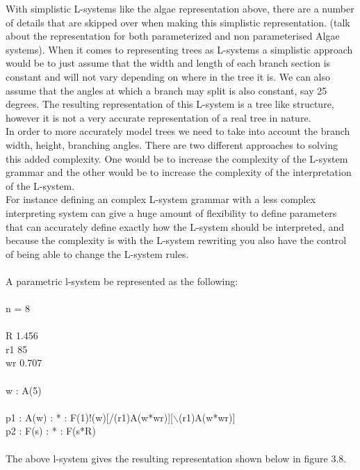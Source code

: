 With simplistic L-systems like the algae representation above, there are a number of details that are skipped over when making this simplistic representation. (talk about the representation for both parameterized and non parameterised Algae systems). When it comes to representing trees as L-systems a simplistic approach would be to just assume that the width and length of each branch section is constant and will not vary depending on where in the tree it is. We can also assume that the angles at which a branch may split is also constant, say 25 degrees. 
The resulting representation of this L-system is a tree like structure, however it is not a very accurate representation of a real tree in nature. \\
In order to more accurately model trees we need to take into account the branch width, height, branching angles. There are two different approaches to solving this added complexity. One would be to increase the complexity of the L-system grammar and the other would be to increase the complexity of the interpretation of the L-system. \\
For instance defining an complex L-system grammar with a less complex interpreting system can give a huge amount of flexibility to define parameters that can accurately define exactly how the L-system should be interpreted, and because the complexity is with the L-system rewriting you also have the control of being able to change the L-system rules. \\
\\ 
A parametric l-system be represented as the following: \\
\\
\hspace*{3cm} n = 8\\
\\
\hspace*{3cm} R 1.456\\
\hspace*{3cm} r1 85\\
\hspace*{3cm} wr 0.707\\
\\
\hspace*{3cm} w : A(5)\\
\\
\hspace*{3cm} p1 : A(w) : * : F(1)!(w)[/(r1)A(w*wr)][$\backslash$(r1)A(w*wr)]\\
\hspace*{3cm} p2 : F(s) : * : F(s*R)\\
\\
The above l-system gives the resulting representation shown below in figure 3.8. 

